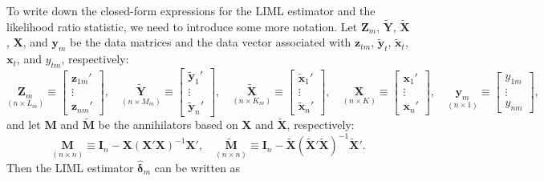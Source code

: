 To write down the closed-form expressions for the LIML estimator and the
likelihood ratio statistic, we need to introduce some more notation. Let $\mathbf{Z}_m$,
$\tilde{\mathbf{Y}}$, $\tilde{\mathbf{X}}$,
$\mathbf{X}$, and $\mathbf{y}_m$ be the data matrices and the data vector associated with $\mathbf{z}_{tm}$,
$\tilde{\mathbf{y}}_t$, $\tilde{\mathbf{x}}_t$, $\mathbf{x}_t$,
and $y_{tm}$, respectively:
\begin{equation}
  \underset{(n \times L_m)}{\mathbf{Z}_m}
  \equiv \begin{bmatrix} \mathbf{z}_{1m}' \\ \vdots \\ \mathbf{z}_{nm}' \end{bmatrix}, \quad
  \underset{(n \times M_m)}{\tilde{\mathbf{Y}}}
  \equiv \begin{bmatrix} \tilde{\mathbf{y}}_1' \\ \vdots \\ \tilde{\mathbf{y}}_n' \end{bmatrix}, \quad
  \underset{(n \times K_m)}{\tilde{\mathbf{X}}}
  \equiv \begin{bmatrix} \tilde{\mathbf{x}}_1' \\ \vdots \\ \tilde{\mathbf{x}}_n' \end{bmatrix}, \quad
  \underset{(n \times K)}{\mathbf{X}}
  \equiv \begin{bmatrix} \mathbf{x}_1' \\ \vdots \\ \mathbf{x}_n' \end{bmatrix}, \quad
  \underset{(n \times 1)}{\mathbf{y}_m}
  \equiv \begin{bmatrix} y_{1m} \\ \vdots \\ y_{nm} \end{bmatrix},
  \label{eq:8.6.7} \tag{8.6.7}
\end{equation}
and let $\mathbf{M}$ and $\tilde{\mathbf{M}}$ be the annihilators based on $\mathbf{X}$ and $\tilde{\mathbf{X}}$, respectively:
\begin{equation}
  \underset{(n \times n)}{\mathbf{M}}
  \equiv \mathbf{I}_n - \mathbf{X}(\mathbf{X}'\mathbf{X})^{-1}\mathbf{X}', \quad
  \underset{(n \times n)}{\tilde{\mathbf{M}}}
  \equiv \mathbf{I}_n - \tilde{\mathbf{X}}(\tilde{\mathbf{X}}'\tilde{\mathbf{X}})^{-1}\tilde{\mathbf{X}}'.
  \label{eq:8.6.8} \tag{8.6.8}
\end{equation}
Then the LIML estimator $\hat{\boldsymbol{\delta}}_m$ can be written as

